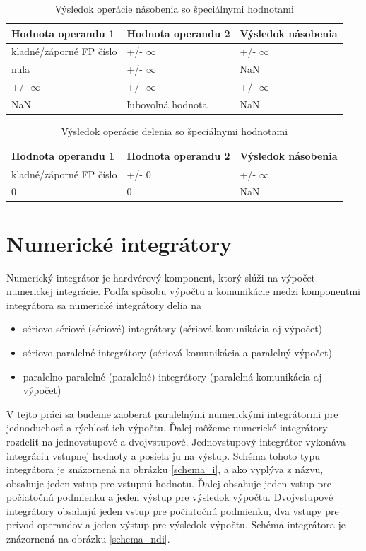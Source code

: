 \begin{table}[h]
\centering
\begin{tabular}{|l|l|l|}
\hline
\rowcolor[HTML]{68CBD0} 
Hodnota operandu 1 & Hodnota operandu 2 & Výsledok násobenia \\ \hline
kladné/záporné FP číslo & +/- $ \infty $ & +/- $ \infty $ \\ \hline
nula           & +/- $ \infty $ & NaN \\ \hline
+/- $ \infty $ & +/- $ \infty $ & +/- $ \infty $ \\ \hline
NaN & ľubovoľná hodnota & NaN \\ \hline
\end{tabular}
\caption{Výsledok operácie násobenia so špeciálnymi hodnotami}
\label{special_nasobenie}
\end{table}

\begin{table}[h]
\centering
\begin{tabular}{|l|l|l|}
\hline
\rowcolor[HTML]{68CBD0} 
Hodnota operandu 1 & Hodnota operandu 2 & Výsledok násobenia \\ \hline
kladné/záporné FP číslo & +/- 0 & +/- $ \infty $ \\ \hline
0 & 0 & NaN \\ \hline
\end{tabular}
\caption{Výsledok operácie delenia so špeciálnymi hodnotami}
\label{special_delenie}
\end{table}

\chapter{Numerické integrátory} \label{NUM_INTEGRATORY}
Numerický integrátor je hardvérový komponent, ktorý slúži na výpočet numerickej integrácie. Podľa spôsobu výpočtu a komunikácie medzi komponentmi integrátora sa numerické integrátory delia na

\begin{itemize}
\item sériovo-sériové (sériové) integrátory (sériová komunikácia aj výpočet)
\item sériovo-paralelné integrátory (sériová komunikácia a paralelný výpočet)
\item paralelno-paralelné (paralelné) integrátory (paralelná komunikácia aj výpočet)
\end{itemize}

V tejto práci sa budeme zaoberať paralelnými numerickými integrátormi pre jednoduchosť a rýchlosť ich výpočtu. Ďalej môžeme numerické integrátory rozdeliť na jednovstupové a dvojvstupové. Jednovstupový integrátor vykonáva integráciu vstupnej hodnoty a posiela ju na výstup. Schéma tohoto typu integrátora je znázornená na obrázku \ref{schema_i}, a ako vyplýva z názvu, obsahuje jeden vstup pre vstupnú hodnotu. Ďalej obsahuje jeden vstup pre počiatočnú podmienku a jeden výstup pre výsledok výpočtu. Dvojvstupové integrátory obsahujú jeden vstup pre počiatočnú podmienku, dva vstupy pre prívod operandov a jeden výstup pre výsledok výpočtu. Schéma integrátora je znázornená na obrázku \ref{schema_ndi}.


